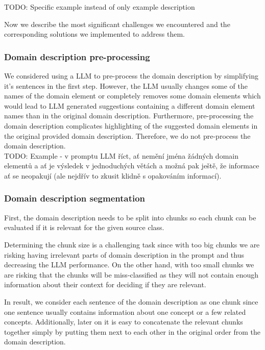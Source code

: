 TODO: Specific example instead of only example description

Now we describe the most significant challenges we encountered and the corresponding solutions we implemented to address them.


\subsubsection{Domain description pre-processing}

We considered using a LLM to pre-process the domain description by simplifying it's sentences in the first step. However, the LLM usually changes some of the names of the domain element or completely removes some domain elements which would lead to LLM generated suggestions containing a different domain element names than in the original domain description. Furthermore, pre-processing the domain description complicates highlighting of the suggested domain elements in the original provided domain description. Therefore, we do not pre-process the domain description. \\

TODO: Example - v promptu LLM říct, ať nemění jména žádných domain elementů a ať je výsledek v jednoduchých větách a možná pak ještě, že informace ať se neopakují (ale nejdřív to zkusit klidně s opakováním informací).


\subsubsection{Domain description segmentation}

First, the domain description needs to be split into chunks so each chunk can be evaluated if it is relevant for the given source class.

Determining the chunk size is a challenging task since with too big chunks we are risking having irrelevant parts of domain description in the prompt and thus decreasing the LLM performance. On the other hand, with too small chunks we are risking that the chunks will be miss-classified as they will not contain enough information about their context for deciding if they are relevant.

In result, we consider each sentence of the domain description as one chunk since one sentence usually contains information about one concept or a few related concepts. Additionally, later on it is easy to concatenate the relevant chunks together simply by putting them next to each other in the original order from the domain description.


